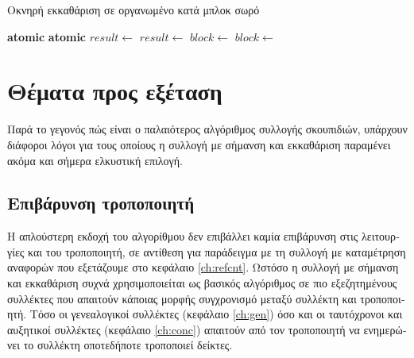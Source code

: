 \begin{greek}
\begin{algorithm}
  \caption{Οκνηρή εκκαθάριση σε οργανωμένο κατά μπλοκ σωρό}
  \label{alg:mrkswp_5}
  \begin{algorithmic}[1]
      \State \textbf{atomic}
      \State {}
         
          \State {} 
        \Else
          \State {}
        \EndIf
      \EndFor
    \EndProcedure
    \Statex
      \State \textbf{atomic}
      \State $result \gets$  
       
        \State {} 
        \State $result \gets$ 
      \EndIf
      \State {} 
    \EndFunction
    \Statex
      \Repeat
        \State $block \gets$ 
          \State {}
            \State \Return{\null}
          \EndIf
        \EndIf
       
      \State {}
    \EndProcedure
    \Statex
     
      \State $block \gets$ 
       
        \State {}
      \EndIf
    \EndProcedure
  \end{algorithmic}
\end{algorithm}


\section{Θέματα προς εξέταση}
Παρά το γεγονός πώς είναι ο παλαιότερος αλγόριθμος συλλογής
σκουπιδιών, υπάρχουν διάφοροι λόγοι για τους 
οποίους η συλλογή με σήμανση και εκκαθάριση παραμένει ακόμα και
σήμερα ελκυστική επιλογή.

\subsection{Επιβάρυνση τροποποιητή}
Η απλούστερη εκδοχή του αλγορίθμου δεν επιβάλλει καμία επιβάρυνση
στις λειτουργίες \textenglish{} και \textenglish{} του 
τροποποιητή, σε αντίθεση για παράδειγμα με τη συλλογή με καταμέτρηση
αναφορών που εξετάζουμε στο κεφάλαιο \ref{ch:refcnt}.
Ωστόσο η συλλογή με σήμανση και εκκαθάριση συχνά χρησιμοποιείται
ως βασικός αλγόριθμος σε πιο εξεζητημένους συλλέκτες που απαιτούν
κάποιας μορφής συγχρονισμό μεταξύ συλλέκτη και τροποποιητή. Τόσο
οι γενεαλογικοί συλλέκτες (κεφάλαιο \ref{ch:gen}) όσο και
οι ταυτόχρονοι και αυξητικοί συλλέκτες (κεφάλαιο \ref{ch:conc})
απαιτούν από τον τροποποιητή να ενημερώνει το συλλέκτη οποτεδήποτε
τροποποιεί δείκτες.


\end{greek}
